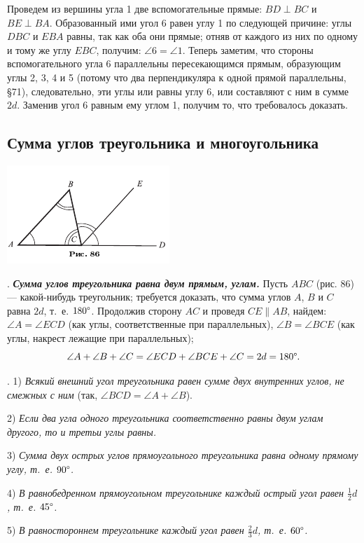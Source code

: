 \documentclass[oneside]{book}
\begin{document}
Проведем из вершины угла 1 две вспомогательные прямые:
$BD\perp BC$ и $BE\perp BA$.
Образованный ими угол 6 равен углу 1 по следующей причине:
углы $DBC$ и $EBA$ равны, так как оба они прямые;
отняв от каждого из них по одному и тому же углу $EBC$, получим: $\angle 6 = \angle 1$.
Теперь заметим, что стороны вспомогательного угла 6 параллельны пересекающимся прямым, образующим углы 2, 3, 4 и 5 (потому что два перпендикуляра к одной прямой параллельны, §71), следовательно, эти углы или равны углу 6, или составляют с ним в сумме $2d$.
Заменив угол 6 равным ему углом 1, получим то, что требовалось доказать.

\subsection*{Сумма углов треугольника и многоугольника}

\includegraphics{pics/ris-86}

.
\textbf{\emph{Сумма углов треугольника равна двум прямым, углам.}}
Пусть $ABC$ (рис. 86) — какой-нибудь треугольник;
требуется доказать, что сумма углов $A$, $B$ и $C$ равна $2d$, т.~е. $180\degree$.
Продолжив сторону $AC$ и проведя $CE\parallel AB$, найдем:
$\angle A = \angle ECD$ (как углы, соответственные при параллельных), $\angle B = \angle BCE$ (как углы, накрест лежащие при параллельных);
\[\angle A + \angle B+\angle C = \angle ECD + \angle BCE + \angle C = 2d =180\degree.\]

.
1) \emph{Всякий внешний угол треугольника равен сумме двух внутренних углов, не смежных с ним} (так, $\angle BCD = \angle A + \angle B$).

2) \emph{Если два угла одного треугольника соответственно равны двум углам другого, то и третьи углы равны.}

3) \emph{Сумма двух острых углов прямоугольного треугольника равна одному прямому углу, т.~е. $90\degree$.}

4) \emph{В равнобедренном прямоугольном треугольнике каждый острый угол равен $\tfrac12 d$, т.~е. $45\degree$.}

5) \emph{В равностороннем треугольнике каждый угол равен $\tfrac23d$, т.~е. $60\degree$.}
\end{document}
